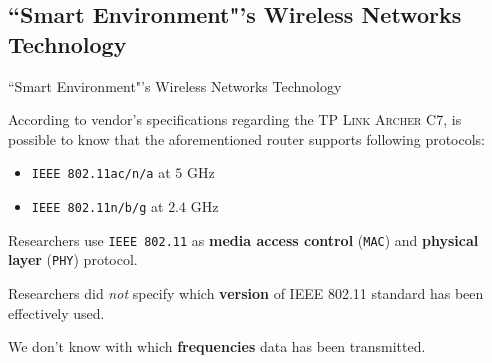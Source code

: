 \documentclass[10pt]{beamer}
\begin{document}
\subsection{``Smart Environment"'s Wireless Networks Technology}
\begin{frame}{``Smart Environment"'s Wireless Networks Technology}

According to vendor's specifications regarding the \textsc{TP Link Archer C7}, is possible to know that the aforementioned router supports following protocols:

\begin{itemize}
\item \texttt{IEEE 802.11ac/n/a} at $5$ GHz
\item \texttt{IEEE 802.11n/b/g} at $2.4$ GHz
\end{itemize}

\begin{block}{}
Researchers use \texttt{IEEE 802.11} as \textbf{media access control} (\texttt{MAC}) and \textbf{physical layer} (\texttt{PHY}) protocol.
\end{block}

\begin{block}{}
Researchers did \textit{not} specify which \textbf{version} of IEEE 802.11 standard has been effectively used. 

We don't know with which \textbf{frequencies} data has been transmitted.
\end{block}

\end{frame} 
\end{document}
